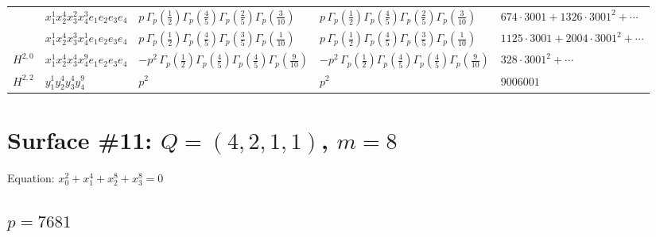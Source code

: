 \documentclass[11pt]{article}
\begin{document}
\begin{table}[ht]
{\begin{tabular}{@{}lllll@{}}
 & $x_{1}^{1} x_{2}^{4} x_{3}^{2} x_{4}^{3}  e_{1} e_{2} e_{3} e_{4}$ & $p \, \Gamma_p \left( \frac{1}{2} \right) \Gamma_p \left( \frac{4}{5} \right) \Gamma_p \left( \frac{2}{5} \right) \Gamma_p \left( \frac{3}{10} \right)$ & $p \, \Gamma_p \left( \frac{1}{2} \right) \Gamma_p \left( \frac{4}{5} \right) \Gamma_p \left( \frac{2}{5} \right) \Gamma_p \left( \frac{3}{10} \right)$ & $674{\cdot}3001{+}1326{\cdot}3001^{2}{+}\cdots$ \\
 & $x_{1}^{1} x_{2}^{4} x_{3}^{3} x_{4}^{1}  e_{1} e_{2} e_{3} e_{4}$ & $p \, \Gamma_p \left( \frac{1}{2} \right) \Gamma_p \left( \frac{4}{5} \right) \Gamma_p \left( \frac{3}{5} \right) \Gamma_p \left( \frac{1}{10} \right)$ & $p \, \Gamma_p \left( \frac{1}{2} \right) \Gamma_p \left( \frac{4}{5} \right) \Gamma_p \left( \frac{3}{5} \right) \Gamma_p \left( \frac{1}{10} \right)$ & $1125{\cdot}3001{+}2004{\cdot}3001^{2}{+}\cdots$ \\
\midrule
$H^{2,0}$ & $x_{1}^{1} x_{2}^{4} x_{3}^{4} x_{4}^{9}  e_{1} e_{2} e_{3} e_{4}$ & $- p^{2} \, \Gamma_p \left( \frac{1}{2} \right) \Gamma_p \left( \frac{4}{5} \right) \Gamma_p \left( \frac{4}{5} \right) \Gamma_p \left( \frac{9}{10} \right)$ & $- p^{2} \, \Gamma_p \left( \frac{1}{2} \right) \Gamma_p \left( \frac{4}{5} \right) \Gamma_p \left( \frac{4}{5} \right) \Gamma_p \left( \frac{9}{10} \right)$ & $328{\cdot}3001^{2}{+}\cdots$ \\
\midrule
$H^{2,2}$ & $y_{1}^{1} y_{2}^{4} y_{3}^{4} y_{4}^{9}$ & $p^{2} \,$ & $p^{2} \,$ & $9006001$ \\
\bottomrule
\end{tabular}
}
\renewcommand{\arraystretch}{1.0}
\end{table}

\newpage

\section*{Surface \#11: $Q=(4, 2, 1, 1)$, $m=8$}

Equation: $x_0^{2} + x_1^{4} + x_2^{8} + x_3^{8} = 0$

\subsection*{$p = 7681$}
\end{document}
